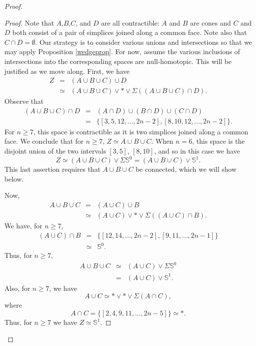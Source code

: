 \documentclass{amsart}
\theoremstyle{definition}
\newcommand{\zs}{{\mathbb S}}
\begin{document}
\begin{proof}
\begin{proof}
    Note that $A$,$B$,$C$, and $D$ are all contractible: $A$ and $B$ are cones and $C$ and $D$ both consist of a pair of simplices joined along a common face. Note also that $C\cap D=\emptyset$. Our strategy is to consider various unions and intersections so that we may apply Proposition \ref{wedgeprop}. For now, assume the various inclusions of intersections into the corresponding spaces are null-homotopic. This will be justified as we move along. First, we have
    \begin{eqnarray*}
        Z & = & (A\cup B\cup C) \cup D \\
          & \simeq & (A\cup B\cup C) \vee \ast \vee \Sigma((A\cup B \cup C)\cap D).
    \end{eqnarray*}
    Observe that 
    \begin{eqnarray*}
        (A\cup B\cup C)\cap D & = & (A\cap D)\cup (B\cap D)\cup (C\cap D) \\
          & = & \{[3,5,12,\dots,2n-2],[8,10,12,\dots,2n-2]\}.
    \end{eqnarray*}
    For $n\ge 7$, this space is contractible as it is two simplices joined along a common face. We conclude that for $n\ge 7$, $Z\simeq A\cup B\cup C$. When $n=6$, this space is the disjoint union of the two intervals $[3,5]$, $[8,10]$, and so in this case we have $$Z\simeq (A\cup B\cup C) \vee \Sigma \zs^0 = (A\cup B\cup C)\vee \zs^1.$$ This last assertion requires that $A\cup B\cup C$ be connected, which we will show below.

    Now, 
    \begin{eqnarray*}
        A\cup B\cup C & = & (A\cup C)\cup B \\
           & \simeq & (A\cup C) \vee \ast \vee \Sigma((A\cup C)\cap B).
    \end{eqnarray*}
    We have, for $n\ge 7$,
    \begin{eqnarray*}
        (A\cup C)\cap B & = & \{[12,14,\dots,2n-2],[9,11,\dots,2n-1]\} \\
           & \simeq & \zs^0.
    \end{eqnarray*}
    Thus, for $n\ge 7$,
    \begin{eqnarray*}
        A\cup B\cup C & \simeq & (A\cup C)\vee \Sigma\zs^0\\
         & = & (A\cup C)\vee \zs^1.
    \end{eqnarray*}
    Also, for $n\ge 7$, we have
    $$A\cup C \simeq  \ast\vee\ast\vee \Sigma(A\cap C),$$
    where
    $$A\cap C = \{[2,4,9,11,\dots,2n-5]\} \simeq\ast.$$
    Thus, for $n\ge 7$ we have $Z\simeq \zs^1$.


\end{proof}
\end{proof}
\end{document}
